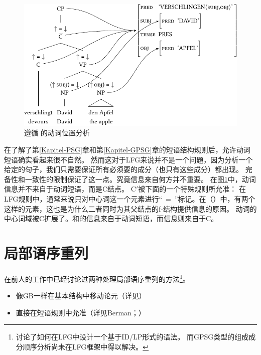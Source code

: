 \begin{figure}
\centerline{%
\includegraphics{Figures/verschlingt-david-den-apfel-lfg-lsp-crop}
}
\caption{\label{Abb-Verbstellung-LFG}遵循 \citet[]{Berman2003a}的动词位置分析}
\end{figure}%

在了解了第\ref{Kapitel-PSG}章和第\ref{Kapitel-GPSG}章的短语结构规则后，允许动词短语确实看起来很不自然。
然而这对于LFG来说并不是一个问题，因为分析一个给定的句子，我们只需要保证所有必须要的成分（也只有这些成分）都出现。 
完备性和一致性的限制保证了这一点。究竟信息来自何方并不重要。
在图\ref{Abb-Verbstellung-LFG}中，动词信息并不来自于动词短语，而是C结点。
C$'$被下面的一个特殊规则所允准：
\ea
{}
\z
在LFG规则中，通常来说只对中心词这一个元素进行“\up~=~\down”标记。在（）中，有两个这样的元素，这也是为什么二者同时为其父结点的f-结构提供信息的原因。
动词的中心词域被C扩展了。\lfgsubj 和\lfgobj 的信息来自于动词短语，而\pred 信息则来自于C。 

\section{局部语序重列}
\label{Abschnitt-LFG-Umstellung}

在前人的工作中已经讨论过两种处理局部语序重列的方法\footnote{%
   \citet[--21]{Kaplan95a}讨论了如何在LFG中设计一个基于ID/LP形式的语法。
  而GPSG类型的组成成分顺序分析尚未在LFG框架中得以解决。%
}。
\begin{itemize}
\item 像GB\indexgbc 一样在基本结构中移动论元（详见\citealp{Choi99a-u}）
\item 直接在短语规则中允准（详见Berman\citeyear[\S~2.1.3.1]{Berman96a-u}；\citeyear{Berman2003a}）
\end{itemize}

